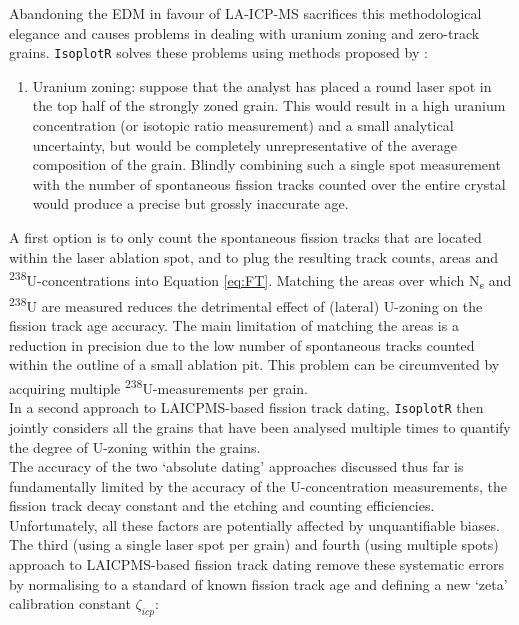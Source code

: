 \begin{refsection}
Abandoning the EDM in favour of LA-ICP-MS sacrifices this
methodological elegance and causes problems in dealing with uranium
zoning and zero-track grains. \texttt{IsoplotR} solves these problems
using methods proposed by \citet{vermeesch20017}:

\begin{enumerate}
\item{Uranium zoning}: suppose that the analyst has placed a round
  laser spot in the top half of the strongly zoned grain. This would
  result in a high uranium concentration (or isotopic ratio
  measurement) and a small analytical uncertainty, but would be
  completely unrepresentative of the average composition of the
  grain. Blindly combining such a single spot measurement with the
  number of spontaneous fission tracks counted over the entire crystal
  would produce a precise but grossly inaccurate age.

\end{enumerate}

A first option is to only count the spontaneous fission tracks that
are located within the laser ablation spot, and to plug the resulting
track counts, areas and \textsuperscript{238}U-concentrations into
Equation \ref{eq:FT}.  Matching the areas over which
N\textsubscript{s} and \textsuperscript{238}U are measured reduces the
detrimental effect of (lateral) U-zoning on the fission track age
accuracy. The main limitation of matching the areas is a reduction in
precision due to the low number of spontaneous tracks counted within
the outline of a small ablation pit. This problem can be circumvented
by acquiring multiple \textsuperscript{238}U-measurements per grain.\\

In a second approach to LAICPMS-based fission track dating,
\texttt{IsoplotR} then jointly considers all the grains that have been
analysed multiple times to quantify the degree of U-zoning within the
grains.\\

The accuracy of the two `absolute dating' approaches discussed thus
far is fundamentally limited by the accuracy of the U-concentration
measurements, the fission track decay constant and the etching and
counting efficiencies.  Unfortunately, all these factors are
potentially affected by unquantifiable biases.\\

The third (using a single laser spot per grain) and fourth (using
multiple spots) approach to LAICPMS-based fission track dating remove
these systematic errors by normalising to a standard of known fission
track age and defining a new `zeta' calibration constant
$\zeta_{icp}$:


\end{refsection}
